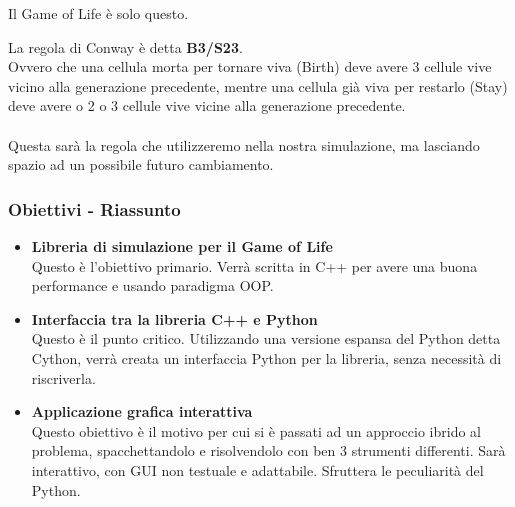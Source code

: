 \documentclass[11pt]{beamer}
\begin{document}
\begin{frame}
\begin{center}
	\huge Il Game of Life è solo questo.
\end{center}
\normalsize La regola di Conway è detta \textbf{B3/S23}.\\
Ovvero che una cellula morta per tornare viva (Birth) deve avere 3 cellule vive vicino alla generazione precedente, mentre una cellula già viva per restarlo (Stay) deve avere o 2 o 3 cellule vive vicine alla generazione precedente.\\\\
Questa sarà la regola che utilizzeremo nella nostra simulazione, ma lasciando spazio ad un possibile futuro cambiamento.
\end{frame}

\begin{frame}
\frametitle{Obiettivi - Riassunto}
\begin{itemize}
	\pause
	\item \textbf{Libreria di simulazione per il Game of Life} \\
	Questo è l'obiettivo primario. Verrà scritta in C++ per avere una buona performance e usando paradigma OOP.
	\pause
	\item \textbf{Interfaccia tra la libreria C++ e Python} \\
	Questo è il punto critico. Utilizzando una versione espansa del Python detta Cython, verrà creata un interfaccia Python per la libreria, senza necessità di riscriverla.
	\pause
	\item \textbf{Applicazione grafica interattiva} \\
	Questo obiettivo è il motivo per cui si è passati ad un approccio ibrido al problema, spacchettandolo e risolvendolo con ben 3 strumenti differenti. Sarà interattivo, con GUI non testuale e adattabile. Sfruttera le peculiarità del Python.
\end{itemize}
\end{frame}
\end{document}
